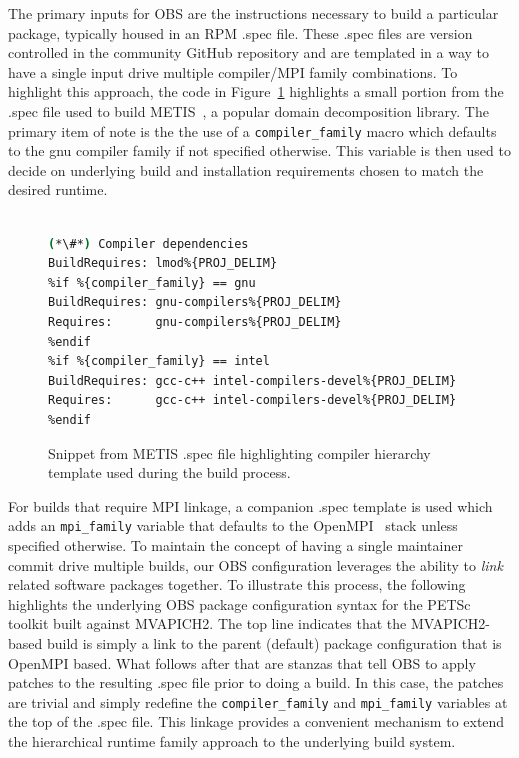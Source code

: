 \documentclass{sig-alternate-05-2015}
\begin{document}
The primary inputs for OBS are the instructions necessary to build a particular
package, typically housed in an RPM .spec file. These .spec files are version controlled in the
community GitHub repository and are templated in a way to have a single input
drive multiple compiler/MPI family combinations.  To highlight this approach,
the code in Figure~\ref{fig:metis_spec} highlights a small portion from the .spec file used to build
METIS~\cite{Karypis:1998}, a popular domain decomposition library. The primary
item of note is the the use of a \texttt{compiler\_family} macro which defaults
to the gnu compiler family if not specified otherwise.  This variable is then used
to decide on underlying build and installation requirements chosen to match the
desired runtime.

\begin{figure}[h]
\begin{lstlisting}[language=bash,keywords={},basicstyle=\fontsize{7.8}{10}\ttfamily,keepspaces]
%{!?compiler_family: %define compiler_family gnu}

(*\#*) Compiler dependencies
BuildRequires: lmod%{PROJ_DELIM}
%if %{compiler_family} == gnu
BuildRequires: gnu-compilers%{PROJ_DELIM}
Requires:      gnu-compilers%{PROJ_DELIM}
%endif
%if %{compiler_family} == intel
BuildRequires: gcc-c++ intel-compilers-devel%{PROJ_DELIM}
Requires:      gcc-c++ intel-compilers-devel%{PROJ_DELIM}
%endif
\end{lstlisting}
\vspace*{-0.3cm}
  \caption{Snippet from METIS .spec file highlighting compiler hierarchy
    template used during the build process.}
    \label{fig:metis_spec}
\end{figure}

For builds that require MPI linkage, a companion .spec template is used which
adds an \texttt{mpi\_family} variable that defaults to the
OpenMPI~\cite{gabriel04:openmpi} stack unless specified otherwise.  To
maintain the concept of having a single maintainer commit drive multiple
builds, our OBS configuration leverages the ability to {\em link} related software
packages together. To illustrate this process, the following highlights the underlying
OBS package configuration syntax for the PETSc toolkit built against
MVAPICH2. The top line indicates that the MVAPICH2-based build is simply a link
to the parent (default) package configuration that is OpenMPI based.  What
follows after that are stanzas that tell OBS to apply patches to the resulting
.spec file prior to doing a build. In this case, the patches are trivial and
simply redefine the \texttt{compiler\_family} and \texttt{mpi\_family} variables at
the top of the .spec file.  This linkage provides a convenient mechanism to
extend the hierarchical runtime family approach to the underlying build system.
\end{document}
